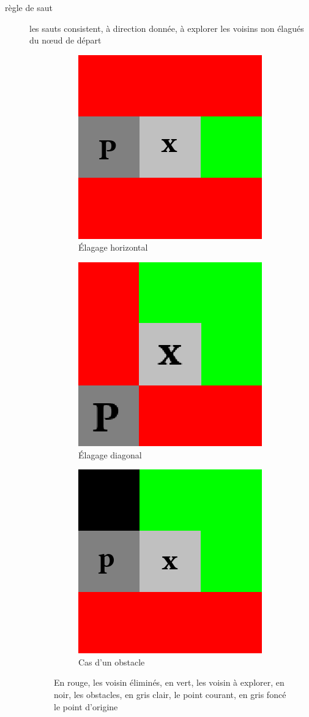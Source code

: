 \documentclass[a4paper,10pt]{article}
\begin{document}
\begin{description}
\item[règle de saut] les sauts consistent, à direction donnée, à explorer les voisins non élagués du nœud
de départ
\begin{figure}[h]
\centering
\begin{subfigure}{.3\textwidth}
\centering
\includegraphics[width=0.5\linewidth]{droit.png}
\caption{Élagage horizontal}
\end{subfigure}
\begin{subfigure}{.3\textwidth}
\centering
\includegraphics[width=0.5\linewidth]{diag.png}
\caption{Élagage diagonal}
\end{subfigure}
\begin{subfigure}{.3\textwidth}
\centering
\includegraphics[width=0.5\linewidth]{obstacle.png}
\caption{Cas d'un obstacle}
\end{subfigure}
\caption{En rouge, les voisin éliminés, en vert, les voisin à explorer, en noir, les obstacles, en gris clair, le point courant, en gris foncé le point d'origine}
\end{figure}


\end{description}
\end{document}

